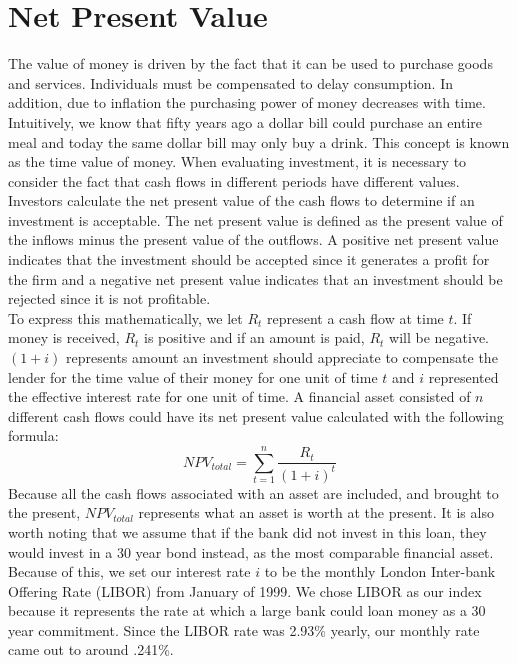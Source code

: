 \documentclass[12 pt]{uncw_thesis}
\theoremstyle{plain}
\theoremstyle{remark}
\theoremstyle{definition}
\begin{document}
\section{Net Present Value}
The value of money is driven by the fact that it can be used to purchase goods and services. Individuals must be compensated to delay consumption. In addition, due to inflation the purchasing power of money decreases with time. Intuitively, we know that fifty years ago a dollar bill could purchase an entire meal and today the same dollar bill may only buy a drink. This concept is known as the time value of money. When evaluating investment, it is necessary to consider the fact that cash flows in different periods have different values.  Investors calculate the net present value of the cash flows to determine if an investment is acceptable. The net present value is defined as the present value of the inflows minus the present value of the outflows. A positive net present value indicates that the investment should be accepted since it generates a profit for the firm and a negative net present value indicates that an investment should be rejected since it is not profitable.\\ 
To express this mathematically, we let \(R_t\) represent a cash flow at time \(t\). If money is received, \(R_t\) is positive and if an amount is paid, \(R_t\) will be negative. \((1+i)\) represents amount an investment should appreciate to compensate the lender for the time value of their money for one unit of time \(t\) and \(i\) represented the effective interest rate for one unit of time. A financial asset consisted of $n$ different cash flows could have its net present value calculated with the following formula:  
\[NPV_{total} = \sum_{t=1}^n \frac{R_t}{(1+i)^t}\]
Because all the cash flows associated with an asset are included, and brought to the present, \(NPV_{total}\) represents what an asset is worth at the present. It is also worth noting that we assume that if the bank did not invest in this loan, they would invest in a 30 year bond instead, as the most comparable financial asset. Because of this, we set our interest rate \(i\) to be the monthly London Inter-bank Offering Rate (LIBOR) from January of 1999. We chose LIBOR as our index because it represents the rate at which a large bank could loan money as a 30 year commitment. Since the LIBOR rate was 2.93\% yearly, our monthly rate came out to around .241\%.
\end{document}

